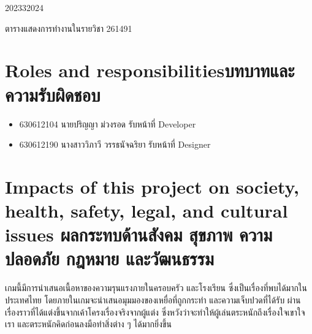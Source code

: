 \begin{plan}{6}{2023}{3}{2024}
    \caption[ตารางการทำงานรายวิชา 261491]{ตารางแสดงการทำงานในรายวิชา 261491}
\end{plan}

\newpage
\section{\ifenglish Roles and responsibilities\else บทบาทและความรับผิดชอบ\fi}
\begin{itemize}
    \item[] 630612104 นายปริญญา ม่วงรอด รับหน้าที่ Developer
    \item[] 630612190 นางสาววิภาวี วรรธนัจฉริยา รับหน้าที่ Designer
\end{itemize}

\section{\ifenglish%
      Impacts of this project on society, health, safety, legal, and cultural issues
  \else%
      ผลกระทบด้านสังคม สุขภาพ ความปลอดภัย กฎหมาย และวัฒนธรรม
  \fi}
  เกมนี้มีการนำเสนอเนื้อหาของความรุนแรงภายในครอบครัว และโรงเรียน ซึ่งเป็นเรื่องที่พบได้มากในประเทศไทย 
  โดยภายในเกมจะนำเสนอมุมมองของเหยื่อที่ถูกกระทำ และความเจ็บปวดที่ได้รับ ผ่านเรื่องราวที่ได้แต่งขึ้นจากเค้าโครงเรื่องจริงจากผู้แต่ง
  ซึ่งหวังว่าจะทำให้ผู้เล่นตระหนักถึงเรื่องใจเขาใจเรา และตระหนักคิดก่อนลงมือทำสิ่งต่าง ๆ ได้มากยิ่งขึ้น

